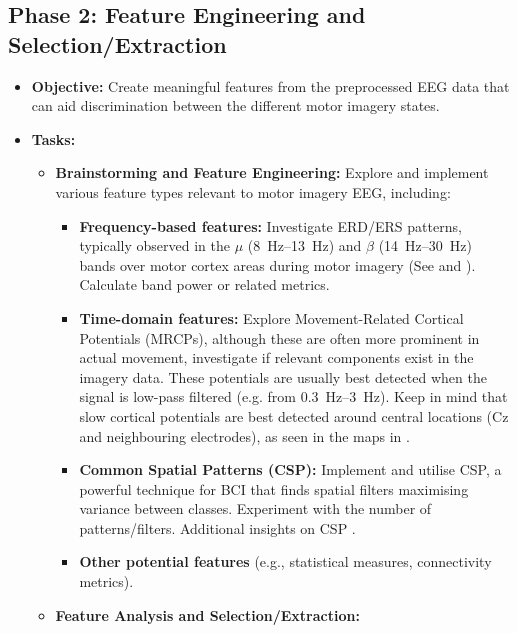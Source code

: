 \documentclass[11pt]{exam}
\begin{document}
    \subsection{Phase 2: Feature Engineering and Selection/Extraction} %
    \begin{itemize}
        \item \textbf{Objective:} Create meaningful features from the preprocessed EEG data that can aid discrimination between the different motor imagery states.
        \item \textbf{Tasks:}
        \begin{itemize}
            \item \textbf{Brainstorming and Feature Engineering:} Explore and implement various feature types relevant to motor imagery EEG, including:
            \begin{itemize}
                \item \textbf{Frequency-based features:} Investigate ERD/ERS patterns, typically observed in the \(\mu\) (\SIrange{8}{13}{\hertz}) and \(\beta\) (\SIrange{14}{30}{\hertz}) bands over motor cortex areas during motor imagery (See  and ). Calculate band power or related metrics.
                \item \textbf{Time-domain features:} Explore Movement-Related Cortical Potentials (MRCPs), although these are often more prominent in actual movement, investigate if relevant components exist in the imagery data. These potentials are usually best detected when the signal is low-pass filtered (e.g. from \SIrange{0.3}{3}{\hertz}). Keep in mind that slow cortical potentials are best detected around central locations (Cz and neighbouring electrodes), as seen in the maps in .
                \item \textbf{Common Spatial Patterns (CSP):} Implement and utilise CSP, a powerful technique for BCI that finds spatial filters maximising variance between classes. Experiment with the number of patterns/filters. Additional insights on CSP \href{https://doi.org/10.1109/MSP.2008.4408441}{}.
                \item \textbf{Other potential features} (e.g., statistical measures, connectivity metrics).
            \end{itemize}
            \item \textbf{Feature Analysis and Selection/Extraction:} %
            \begin{itemize}

\end{itemize}
\end{itemize}
\end{itemize}
\end{document}
